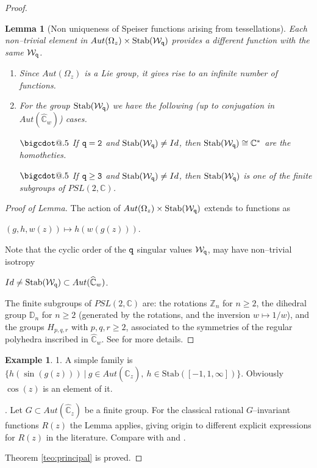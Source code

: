 \documentclass[final,3p,times]{elsarticle}
\makeatletter
\newcommand{\ZZ}{\ensuremath{{\mathbb Z}}}
\newcommand{\CC}{\ensuremath{{\mathbb C}}}
\newcommand{\CW}{\ensuremath{{\widehat{\mathbb C}}}}
\newcommand*\bigcdot{\mathpalette\bigcdot@{.5}}
\newcommand*\bigcdot@[2]{\mathbin{\vcenter{\hbox{\scalebox{#2}{$\m@th#1\bullet$}}}}}
\newtheorem{lemma}[theorem]{Lemma}
\theoremstyle{definition}
\newtheorem{example}{Example}[section]
\makeatother
\begin{document}
\begin{proof}
\begin{lemma}[Non uniqueness of Speiser functions arising from tessellations]
\noindent 
Each non--trivial element in 
$Aut(\Omega_z) \times \text{Stab}(\mathcal{W}_{\tt q})$ provides a
different function with the same $\mathcal{W}_{\tt q}$.
\begin{enumerate}[label=\roman*),leftmargin=*]
\item 
Since $Aut(\Omega_z)$ is a Lie group, it gives rise to an infinite 
number of functions.

\item
For the group $\text{Stab}(\mathcal{W}_{\tt q})$ we have the following 
(up to conjugation in $Aut(\CW_w)$) cases.

\noindent
$\bigcdot$ If $\tt q=2$ and $\text{Stab}(\mathcal{W}_{\tt q})\neq Id$, then 
$\text{Stab}(\mathcal{W}_{\tt q})\cong\CC^*$ are the homotheties.

\noindent
$\bigcdot$ If $\tt q\geq 3$ and $\text{Stab}(\mathcal{W}_{\tt q})\neq Id$, then 
$\text{Stab}(\mathcal{W}_{\tt q})$ is one of the finite subgroups of $PSL(2,\CC)$.  
\end{enumerate}
\end{lemma}
\begin{proof}[Proof of Lemma]
The action of $Aut(\Omega_z) \times \text{Stab}(\mathcal{W}_{\tt q})$ extends to functions as 

\centerline{$(g,h,w(z)) \mapsto h(w(g(z)))$.}

\noindent
Note that the cyclic order of the $\tt q$ singular
values $\mathcal{W}_{\tt q}$, may have non--trivial isotropy

\centerline{
$Id\neq\text{Stab}(\mathcal{W}_{\tt q})\subset Aut(\CW_w)$.}

\noindent
The finite subgroups of $PSL(2,\CC)$ are:
the rotations $\ZZ_n$ for $n\geq2$, 
the dihedral group $\mathbb{D}_n$ for $n\geq2$ 
(generated by the rotations, and the inversion $w\mapsto 1/w$), and
the groups $H_{p,q,r}$ with $p,q,r\geq 2$, associated to the symmetries of the 
regular polyhedra inscribed in $\CW_w$.
See \cite{Sullivan-notes} for more details.
\end{proof}



\begin{example} 1. 
A simple family is 
$\{ h(\sin (g(z))) 
\ \vert \ 
g \in Aut(\CW_z), \ h \in \text{Stab} ([-1,1,\infty]) \}$. 
Obviously $\cos(z)$ is an element of it.

. Let $G \subset Aut(\CW_z)$ be a finite group. For the classical rational $G$--invariant functions $R(z)$ the Lemma applies, giving
origin to different explicit expressions for $R(z)$ in 
the literature. Compare with \cite{Schwarz} and \cite{Pakovich}.  
\end{example}



Theorem \ref{teo:principal} is proved.
\end{proof}
\end{document}
